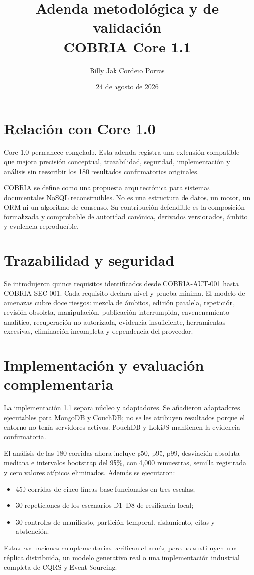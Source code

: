 \documentclass[11pt]{article}
\title{Adenda metodológica y de validación\\COBRIA Core 1.1}
\author{Billy Jak Cordero Porras}
\date{24 de agosto de 2026}
\begin{document}
\maketitle
\section*{Relación con Core 1.0}
Core 1.0 permanece congelado. Esta adenda registra una extensión compatible que mejora precisión conceptual, trazabilidad, seguridad, implementación y análisis sin reescribir los 180 resultados confirmatorios originales.

COBRIA se define como una propuesta arquitectónica para sistemas documentales NoSQL reconstruibles. No es una estructura de datos, un motor, un ORM ni un algoritmo de consenso. Su contribución defendible es la composición formalizada y comprobable de autoridad canónica, derivados versionados, ámbito y evidencia reproducible.

\section*{Trazabilidad y seguridad}
Se introdujeron quince requisitos identificados desde COBRIA-AUT-001 hasta COBRIA-SEC-001. Cada requisito declara nivel y prueba mínima. El modelo de amenazas cubre doce riesgos: mezcla de ámbitos, edición paralela, repetición, revisión obsoleta, manipulación, publicación interrumpida, envenenamiento analítico, recuperación no autorizada, evidencia insuficiente, herramientas excesivas, eliminación incompleta y dependencia del proveedor.

\section*{Implementación y evaluación complementaria}
La implementación 1.1 separa núcleo y adaptadores. Se añadieron adaptadores ejecutables para MongoDB y CouchDB; no se les atribuyen resultados porque el entorno no tenía servidores activos. PouchDB y LokiJS mantienen la evidencia confirmatoria.

El análisis de las 180 corridas ahora incluye p50, p95, p99, desviación absoluta mediana e intervalos bootstrap del 95\%, con 4,000 remuestras, semilla registrada y cero valores atípicos eliminados. Además se ejecutaron:
\begin{itemize}
\item 450 corridas de cinco líneas base funcionales en tres escalas;
\item 30 repeticiones de los escenarios D1--D8 de resiliencia local;
\item 30 controles de manifiesto, partición temporal, aislamiento, citas y abstención.
\end{itemize}
Estas evaluaciones complementarias verifican el arnés, pero no sustituyen una réplica distribuida, un modelo generativo real o una implementación industrial completa de CQRS y Event Sourcing.
\end{document}
